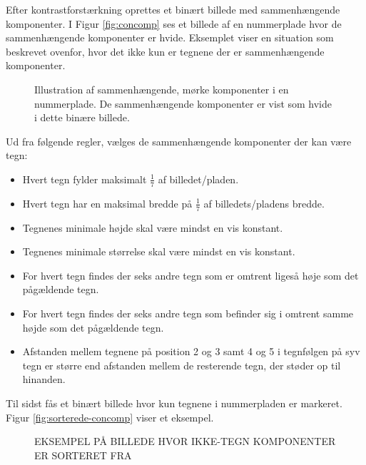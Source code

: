 Efter kontrastforstærkning oprettes et binært billede med sammenhængende komponenter. I Figur \vref{fig:concomp} ses et billede af en nummerplade hvor de sammenhængende komponenter er hvide. Eksemplet viser en situation som beskrevet ovenfor, hvor det ikke kun er tegnene der er sammenhængende komponenter.

\begin{figure}[htp]
  \centering
  \caption{Illustration af sammenhængende, mørke komponenter i en nummerplade. De sammenhængende komponenter er vist som hvide i dette binære billede.}
  \label{fig:concomp}
\end{figure}

Ud fra følgende regler, vælges de sammenhængende komponenter der kan være tegn:

\begin{itemize}
\item Hvert tegn fylder maksimalt $\frac{1}{7}$ af billedet/pladen.
\item Hvert tegn har en maksimal bredde på $\frac{1}{7}$ af billedets/pladens bredde.
\item Tegnenes minimale højde skal være mindst en vis konstant.%
\item Tegnenes minimale størrelse skal være mindst en vis konstant.%
\item For hvert tegn findes der seks andre tegn som er omtrent ligeså høje som det pågældende tegn.
\item For hvert tegn findes der seks andre tegn som befinder sig i omtrent samme højde som det pågældende tegn.
\item Afstanden mellem tegnene på position 2 og 3 samt 4 og 5 i tegnfølgen på syv tegn er større end afstanden mellem de resterende tegn, der støder op til hinanden.
\end{itemize}



Til sidst fås et binært billede hvor kun tegnene i nummerpladen er markeret. Figur \vref{fig:sorterede-concomp} viser et eksempel.

\begin{figure}[htp]
  \centering
  \caption{EKSEMPEL PÅ BILLEDE HVOR IKKE-TEGN KOMPONENTER ER SORTERET FRA}
  \label{fig:sorterede-concomp}
\end{figure}


